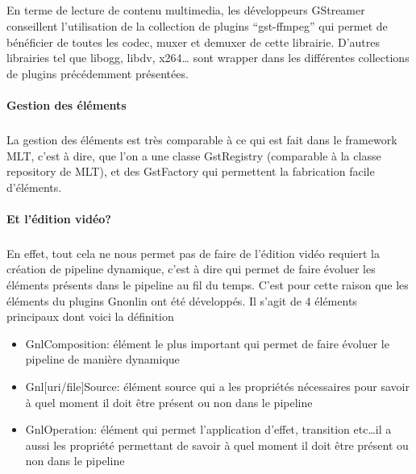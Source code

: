 \subparagraph{}

En terme de lecture de contenu multimedia, les développeurs GStreamer
conseillent l'utilisation de la collection de plugins ``gst-ffmpeg''
qui permet de bénéficier de toutes les codec, muxer et demuxer de
cette librairie. D'autres librairies tel que libogg, libdv, x264\ldots
sont wrapper dans les différentes collections de plugins précédemment
présentées.

\paragraph{Gestion des éléments}

\subparagraph{}

La gestion des éléments est très comparable à ce qui est fait dans
le framework MLT, c'est à dire, que l'on a une classe GstRegistry
(comparable à la classe repository de MLT), et des GstFactory qui
permettent la fabrication facile d'éléments.

\paragraph{Et l'édition vidéo?}

\subparagraph{}

En effet, tout cela ne nous permet pas de faire  de l'édition vidéo
requiert la création de pipeline dynamique, c'est à dire qui permet
de faire évoluer les éléments présents dans le pipeline au fil du
temps.  C'est pour cette raison que les éléments du plugins Gnonlin
ont été développés. Il s'agit de 4 éléments principaux dont voici
la définition

\begin{itemize}

  \item {GnlComposition: élément le plus important qui permet de
  faire évoluer
    le pipeline de manière dynamique}

  \item{Gnl[uri/file]Source: élément source qui a les propriétés
    nécessaires pour savoir à quel moment il doit être présent ou
    non dans le pipeline}

  \item{GnlOperation: élément qui permet l'application d'effet,
  transition
    etc\ldots il a aussi les propriété permettant de savoir à quel
    moment il doit être présent ou non dans le pipeline}

\end{itemize}

